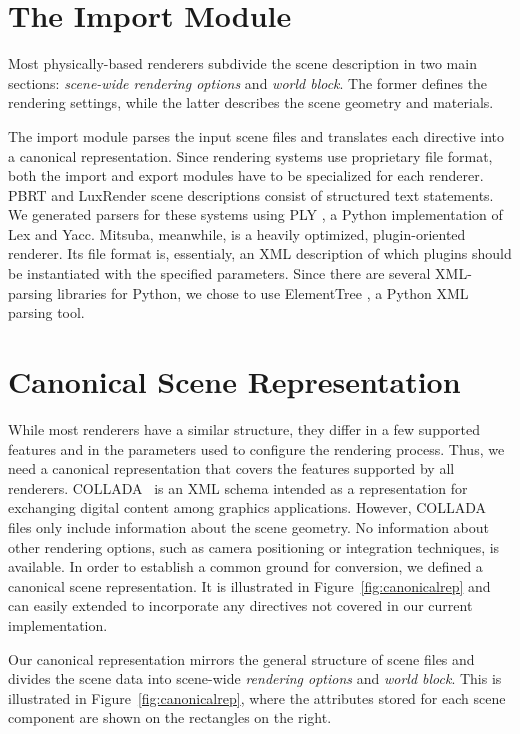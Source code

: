 \section{The Import Module}
Most physically-based renderers subdivide the scene description in two main sections: {\it scene-wide rendering options} and {\it world block}. The former defines the rendering settings, while the latter describes the scene geometry and materials.

The import module parses the input scene files and translates each directive into a canonical representation. Since rendering systems use proprietary file format, both the import and export modules have to be specialized for each renderer.
%
PBRT and LuxRender scene descriptions consist of structured text statements. We generated parsers for these systems using PLY \cite{ply}, a Python implementation of Lex and Yacc.
%
Mitsuba, meanwhile, is a heavily optimized, plugin-oriented renderer. Its file format is, essentialy, an XML description of which plugins should be instantiated with the specified parameters. Since there are several XML-parsing libraries for Python, we chose to use ElementTree \cite{ET}, a Python XML parsing tool.

\section{Canonical Scene Representation}
While most renderers have a similar structure, they differ in a few supported features and in the parameters used to configure the rendering process. Thus, we need a canonical representation that covers the features supported by all renderers. 
COLLADA~\cite{collada} is an XML schema intended as a representation for exchanging digital content among graphics applications. However, COLLADA files only include information about the scene geometry. No information about other rendering options, such as camera positioning or integration techniques, is available. 
In order to establish a common ground for conversion, we defined a canonical scene representation. It is illustrated in Figure~\ref{fig:canonicalrep} and can easily extended to incorporate any directives not covered in our current implementation.
 
Our canonical representation mirrors the general structure of scene files and divides the scene data into scene-wide {\it rendering options} and {\it world block}. This is illustrated in Figure~\ref{fig:canonicalrep}, where the attributes stored for each scene component are shown on the rectangles on the right.

